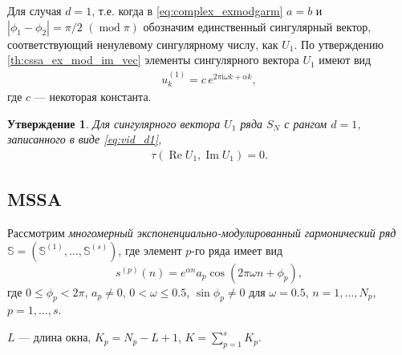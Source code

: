 \documentclass[specialist,
               substylefile = spbu.rtx,
               subf,href,colorlinks=true, 12pt]{disser}
\def\RE{\mathop{\mathrm{Re}}}
\def\mod{\mathop{\mathrm{mod}}}
\def\IM{\mathop{\mathrm{Im}}}
\newtheorem{Th}{Утверждение}
\begin{document}
Для случая $d=1$, т.е. когда в \eqref{eq:complex_exmodgarm} $a=b$ и $|\phi_1 - \phi_2| = \pi/2 \,\,(\mod \pi)$ обозначим единственный сингулярный вектор, соответствующий ненулевому сингулярному числу, как $U_1$.
По утверждению \ref{th:cssa_ex_mod_im_vec} элементы сингулярного вектора $U_1$ имеют вид
\begin{gather} \label{eq:vid_d1}
	u_k^{(1)} = c\,e^{2\pi \mathrm{i} \omega k + \alpha k},
\end{gather}
где $c$ --- некоторая константа.

\begin{Th}  \cite[Утверждение 14]{Zhornikova2016} \label{th:th_tau_cssa_d1}
Для сингулярного вектора $U_1$ ряда $S_N$ с рангом $d=1$, записанного в виде \eqref{eq:vid_d1},
 \begin{gather*}
 \tau(\RE U_1, \IM U_1)=0.
 \end{gather*}
\end{Th}


\subsection{MSSA}
\label{sec:mssa_theory}

Рассмотрим \textit{многомерный экспоненциально-модулированный гармонический ряд} $\mathbb{S} = \left(\mathbb{S}^{(1)},
 \ldots,\mathbb{S}^{(s)}\right)$, где элемент $p$-го ряда имеет вид
\begin{equation} \label{eq:em_mssa}
 s^{(p)}(n) = e^{\alpha n} a_p\cos(2\pi\omega n + \phi_p),
\end{equation}
где $0 \leqslant\phi_p < 2\pi$, $a_p \not = 0$, $0<\omega \leqslant 0.5$, $\sin \phi_p \not = 0$ для $\omega = 0.5$, $n=1,\ldots,N_p$, $p=1,\ldots,s$.

$L$ --- длина окна, $K_p = N_p - L + 1$, $K = \sum_{p=1}^{s} K_p$.
\end{document}

